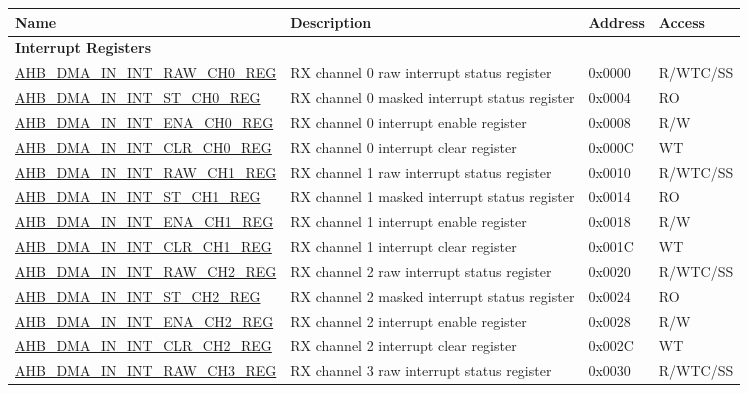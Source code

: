 \begin{longtable}{ | l | p{10cm} | p{1.3cm} | l | }
\hline\rowcolor{lightgray}
\textbf{Name} & \textbf{Description} &  \textbf{Address} & \textbf{Access} \\ \hline
\endhead
\multicolumn{4}{|l|}{\textbf{Interrupt Registers}} \\ \hline
\hyperref[regdesc:AHBDMAININTRAWCHNREG]{AHB\_DMA\_IN\_INT\_RAW\_CH0\_REG} & RX channel 0 raw interrupt status register & 0x0000 & R/WTC/SS \\ \hline
\hyperref[regdesc:AHBDMAININTSTCHNREG]{AHB\_DMA\_IN\_INT\_ST\_CH0\_REG} & RX channel 0 masked interrupt status register & 0x0004 & RO \\ \hline
\hyperref[regdesc:AHBDMAININTENACHNREG]{AHB\_DMA\_IN\_INT\_ENA\_CH0\_REG} & RX channel 0 interrupt enable register & 0x0008 & R/W \\ \hline
\hyperref[regdesc:AHBDMAININTCLRCHNREG]{AHB\_DMA\_IN\_INT\_CLR\_CH0\_REG} & RX channel 0 interrupt clear register & 0x000C & WT \\ \hline
\hyperref[regdesc:AHBDMAININTRAWCHNREG]{AHB\_DMA\_IN\_INT\_RAW\_CH1\_REG} & RX channel 1 raw interrupt status register & 0x0010 & R/WTC/SS \\ \hline
\hyperref[regdesc:AHBDMAININTSTCHNREG]{AHB\_DMA\_IN\_INT\_ST\_CH1\_REG} & RX channel 1 masked interrupt status register & 0x0014 & RO \\ \hline
\hyperref[regdesc:AHBDMAININTENACHNREG]{AHB\_DMA\_IN\_INT\_ENA\_CH1\_REG} & RX channel 1 interrupt enable register & 0x0018 & R/W \\ \hline
\hyperref[regdesc:AHBDMAININTCLRCHNREG]{AHB\_DMA\_IN\_INT\_CLR\_CH1\_REG} & RX channel 1 interrupt clear register & 0x001C & WT \\ \hline
\hyperref[regdesc:AHBDMAININTRAWCHNREG]{AHB\_DMA\_IN\_INT\_RAW\_CH2\_REG} & RX channel 2 raw interrupt status register & 0x0020 & R/WTC/SS \\ \hline
\hyperref[regdesc:AHBDMAININTSTCHNREG]{AHB\_DMA\_IN\_INT\_ST\_CH2\_REG} & RX channel 2 masked interrupt status register & 0x0024 & RO \\ \hline
\hyperref[regdesc:AHBDMAININTENACHNREG]{AHB\_DMA\_IN\_INT\_ENA\_CH2\_REG} & RX channel 2 interrupt enable register & 0x0028 & R/W \\ \hline
\hyperref[regdesc:AHBDMAININTCLRCHNREG]{AHB\_DMA\_IN\_INT\_CLR\_CH2\_REG} & RX channel 2 interrupt clear register & 0x002C & WT \\ \hline
\hyperref[regdesc:AHBDMAININTRAWCHNREG]{AHB\_DMA\_IN\_INT\_RAW\_CH3\_REG} & RX channel 3 raw interrupt status register & 0x0030 & R/WTC/SS \\ \hline

\end{longtable}
